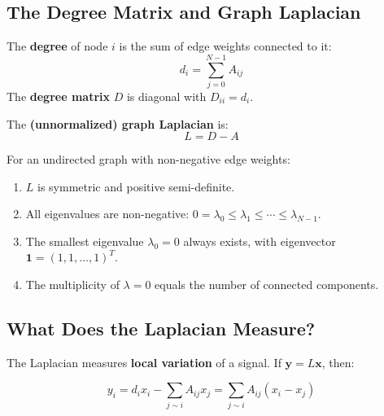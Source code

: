 \begin{notechapter}
\subsection{The Degree Matrix and Graph Laplacian}

\begin{definition}
The \textbf{degree} of node $i$ is the sum of edge weights connected 
to it:
\begin{equation}
d_i = \sum_{j=0}^{N-1} A_{ij}
\end{equation}
The \textbf{degree matrix} $D$ is diagonal with $D_{ii} = d_i$.
\end{definition}

\begin{definition}
The \textbf{(unnormalized) graph Laplacian} is:
\begin{equation}
L = D - A
\end{equation}
\end{definition}

\begin{theorem}
\label{dft-to-gnn:thm:laplacian-properties}
For an undirected graph with non-negative edge weights:
\begin{enumerate}[label=(\alph*)]
\item $L$ is symmetric and positive semi-definite.
\item All eigenvalues are non-negative: 
      $0 = \lambda_0 \leq \lambda_1 \leq \cdots \leq \lambda_{N-1}$.
\item The smallest eigenvalue $\lambda_0 = 0$ always exists, with 
      eigenvector $\mathbf{1} = (1, 1, \ldots, 1)^T$.
\item The multiplicity of $\lambda = 0$ equals the number of connected 
      components.
\end{enumerate}
\end{theorem}

\subsection{What Does the Laplacian Measure?}

The Laplacian measures \textbf{local variation} of a signal. If 
$\mathbf{y} = L\mathbf{x}$, then:

\begin{equation}
y_i = d_i x_i - \sum_{j \sim i} A_{ij} x_j 
    = \sum_{j \sim i} A_{ij}(x_i - x_j)
\end{equation}


\end{notechapter}
